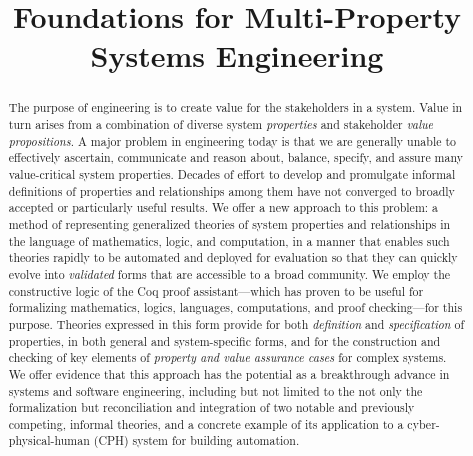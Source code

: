 \documentclass[conference]{IEEEtran}
\begin{document}
%
\title{Foundations for Multi-Property Systems Engineering}

\author{
}


\maketitle
\begin{abstract}
The purpose of engineering is to create value for the stakeholders in a system. Value in turn arises from a combination of diverse system {\em properties} and stakeholder {\em value propositions}. A major problem in engineering today is that we are generally unable to effectively ascertain, communicate and reason about, balance, specify, and assure many value-critical system properties. Decades of effort to develop and promulgate informal definitions of properties and relationships among them have not converged to broadly accepted or particularly useful results. We offer a new approach to this problem: a method of representing generalized theories of system properties and relationships in the language of mathematics, logic, and computation, in a manner that enables such theories rapidly to be automated and deployed for evaluation so that they can quickly evolve into {\em validated} forms that are accessible to a broad community. We employ the constructive logic of the Coq proof assistant---which has proven to be useful for formalizing mathematics, logics, languages, computations, and proof checking---for this purpose. Theories expressed in this form provide for both {\em definition} and {\em specification} of properties, in both general and system-specific forms, and for the construction and checking of key elements of {\em property and value assurance cases} for complex systems. We offer evidence that this approach has the potential as a breakthrough advance in systems and software engineering, including but not limited to the not only the formalization but reconciliation and integration of two notable and previously competing, informal theories, and a concrete example of its application to a cyber-physical-human (CPH) system for building automation.
\end{abstract}
\end{document}
